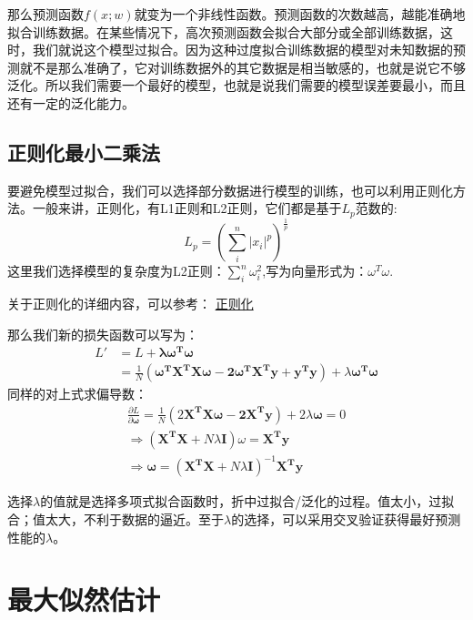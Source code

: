\documentclass[a4paper,12pt]{book}
\begin{document}
    那么预测函数$f(x;w)$就变为一个非线性函数。预测函数的次数越高，越能准确地拟合训练数据。在某些情况下，高次预测函数会拟合大部分或全部训练数据，这时，我们就说这个模型过拟合。因为这种过度拟合训练数据的模型对未知数据的预测就不是那么准确了，它对训练数据外的其它数据是相当敏感的，也就是说它不够泛化。所以我们需要一个最好的模型，也就是说我们需要的模型误差要最小，而且还有一定的泛化能力。
    
    \section{正则化最小二乘法}
    
    要避免模型过拟合，我们可以选择部分数据进行模型的训练，也可以利用正则化方法。一般来讲，正则化，有L1正则和L2正则，它们都是基于$L_p$范数的:
    $$L_p=(\sum_i^n\vert x_i\vert ^p)^\frac{1}{p}$$
    这里我们选择模型的复杂度为L2正则：$\sum_i^n\omega_i^2$,写为向量形式为：$\omega^T\omega$.
    
    
    关于正则化的详细内容，可以参考：
    \href{http://blog.csdn.net/heyongluoyao8/article/details/49429629}{正则化}
    
    那么我们新的损失函数可以写为：
    $$
    \begin{aligned}
    L' &= L+\boldsymbol{\lambda\omega^T\omega}\\
    &=\frac{1}{N}(\boldsymbol{\omega^TX^TX\omega-2\omega^TX^Ty+y^Ty})+\lambda\boldsymbol{\omega^T\omega}
    \end{aligned}
    $$
    同样的对上式求偏导数：
    \begin{equation}
        \begin{split}
            \label{E1}
            \frac{\partial{L}}{\partial{\boldsymbol{\omega}}}=\frac{1}{N}(2\boldsymbol{X^TX\omega-2X^Ty})+2\lambda\boldsymbol{\omega}=0\\
            \Rightarrow(\boldsymbol{X^TX}+N\lambda\boldsymbol{I})\omega=\boldsymbol{X^Ty}\\
            \Rightarrow\boldsymbol{\omega}=(\boldsymbol{X^TX}+N\lambda\boldsymbol{I})^{-1}\boldsymbol{X^Ty}
        \end{split}
    \end{equation}
    
    
    选择$\lambda$的值就是选择多项式拟合函数时，折中过拟合/泛化的过程。值太小，过拟合；值太大，不利于数据的逼近。至于$\lambda$的选择，可以采用交叉验证获得最好预测性能的$\lambda$。

    \chapter{最大似然估计}
\end{document}
